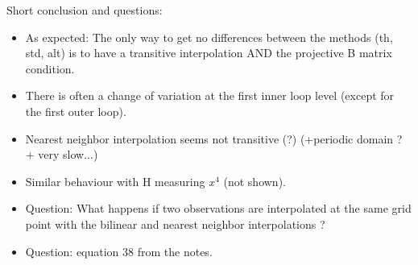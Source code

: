 \documentclass[francais]{beamer}
\begin{document}
\begin{frame}{Short conclusion and questions:}
\begin{itemize}
\item As expected: The only way to get no differences between the methods (th, std, alt) is to have a transitive interpolation AND the projective B matrix condition.\\
\item There is often a change of variation at the first inner loop level (except for the first outer loop).\\
\item Nearest neighbor interpolation seems not transitive (?) (+periodic domain ? + very slow...)\\
\item Similar behaviour with H measuring $x^4$ (not shown).
\item Question: What happens if two observations are interpolated at the same grid point with the bilinear and nearest neighbor interpolations ?
\item Question: equation 38 from the notes.
\end{itemize}
\end{frame}


\usebackgroundtemplate{}
\end{document}
